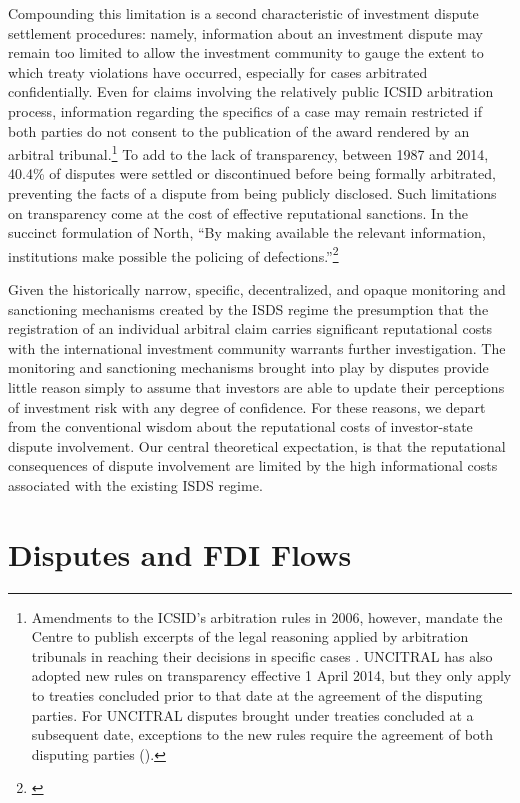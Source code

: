 \documentclass[12pt,onesided]{amsart}
\begin{document}
Compounding this limitation is a second characteristic of investment dispute settlement procedures: namely, information about an investment dispute may remain too limited to allow the investment community to gauge the extent to which treaty violations have occurred, especially for cases arbitrated confidentially. Even for claims involving the relatively public ICSID arbitration process, information regarding the specifics of a case may remain restricted if both parties do not consent to the publication of the award rendered by an arbitral tribunal.\footnote{Amendments to the ICSID's arbitration rules in 2006, however, mandate the Centre to publish excerpts of the legal reasoning applied by arbitration tribunals in reaching their decisions in specific cases \citep{antonietti:2006}. UNCITRAL has also adopted new rules on transparency effective 1 April 2014, but they only apply to treaties concluded prior to that date at the agreement of the disputing parties. For UNCITRAL disputes brought under treaties concluded at a subsequent date, exceptions to the new rules require the agreement of both disputing parties (\citealp[p. 33--40]{uncitral:2013}).} To add to the lack of transparency, between 1987 and 2014, 40.4\% of disputes were settled or discontinued before being formally arbitrated, preventing the facts of a dispute from being publicly disclosed. Such limitations on transparency come at the cost of effective reputational sanctions. In the succinct formulation of North, ``By making available the relevant information, institutions make possible the policing of defections.''\footnote{\citet[p. 57]{north1990institutions}} 

Given the historically narrow, specific, decentralized, and opaque monitoring and sanctioning mechanisms created by the ISDS regime the presumption that the registration of an individual arbitral claim carries significant reputational costs with the international investment community warrants further investigation. The monitoring and sanctioning mechanisms brought into play by disputes provide little reason simply to assume that investors are able to update their perceptions of investment risk with any degree of confidence. For these reasons, we depart from the conventional wisdom about the reputational costs of investor-state dispute involvement. Our central theoretical expectation, is that the reputational consequences of dispute involvement are limited by the high informational costs associated with the existing ISDS regime. 

\section*{Disputes and FDI Flows}
\end{document}
